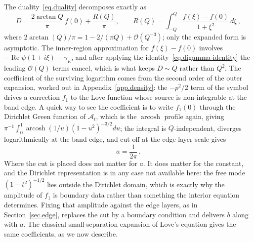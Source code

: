 \documentclass[11pt,a4paper]{article}
\theoremstyle{definition}
\begin{document}
The duality~\eqref{eq.duality} decomposes exactly as
\begin{equation}\label{eq.D-split}
    D = \frac{2\arctan Q}{\pi}\,f(0) + \frac{R(Q)}{\pi},
    \qquad R(Q) = \int_{-Q}^{Q}\frac{f(\xi)-f(0)}{1+\xi^2}\,d\xi\,,
\end{equation}
where $2\arctan(Q)/\pi = 1 - 2/(\pi Q) + \mathcal O(Q^{-3})$; only the expanded
form is asymptotic.
The inner-region approximation for $f(\xi) - f(0)$ involves
$-\operatorname{Re}\psi(1+i\xi) - \gamma_E$, and after applying
the identity~\eqref{eq.digamma-identity} the leading $\mathcal O(Q)$ terms
cancel, which is what keeps $D \sim Q$ rather than $Q^2$.  The coefficient of
the surviving logarithm comes from the second order of the outer expansion,
worked out in Appendix~\ref{app.density}: the $-p^2/2$ term of the symbol drives
a correction $f_1$ to the Love function whose source is non-integrable at the
band edge.  A quick way to see the coefficient is to write $f_1(0)$ through the
Dirichlet Green function of $\mathcal A_t$, which is the $\operatorname{arcosh}$
profile again, giving
$\pi^{-1}\int_0^1\operatorname{arcosh}(1/u)(1-u^2)^{-3/2}du$; the integral is
$Q$-independent, diverges logarithmically at the band edge, and cut off at the
edge-layer scale gives
\begin{equation}\label{eq.a-result}
  a = \frac{1}{2\pi}\,.
\end{equation}
Where the cut is placed does not matter for $a$.  It does matter for the
constant, and the Dirichlet representation is in any case not available here:
the free mode $(1-t^2)^{-1/2}$ lies outside the Dirichlet domain, which is
exactly why the amplitude of $f_1$ is boundary data rather than something the
interior equation determines.  Fixing that amplitude against the edge layers, as
in Section~\ref{sec.edge}, replaces the cut by a boundary condition and delivers
$b$ along with $a$.  The classical small-separation expansion of Love's equation
gives the same coefficients, as we now describe.
\end{document}
